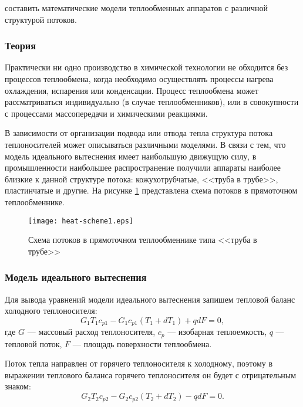 
\goal составить математические модели теплообменных аппаратов с различной структурой потоков.

\subsubsection{Теория}
Практически ни одно производство в химической технологии не обходится без процессов теплообмена, когда необходимо осуществлять процессы нагрева охлаждения, испарения или конденсации.
 Процесс теплообмена может рассматриваться индивидуально (в случае теплообменников), или в совокупности с процессами массопередачи и химическими реакциями.

В зависимости от организации подвода или отвода тепла структура потока теплоносителей может описываться различными моделями. В связи с тем, что модель идеального вытеснения имеет наибольшую движущую силу, в промышленности наибольшее распространение получили аппараты наиболее близкие к данной структуре потока: кожухотрубчатые, <<труба в трубе>>, пластинчатые и другие. На рисунке  \ref{fig:heat.scheme1} представлена схема потоков в прямоточном теплообменнике.

\begin{figure}[h]
	\begin{center}
		\texttt{[image: heat-scheme1.eps]}
	\end{center}
	\caption{Схема потоков в прямоточном теплообменнике типа <<труба в трубе>>} \label{fig:heat.scheme1}
\end{figure}

\subsubsection*{Модель идеального вытеснения}
Для вывода уравнений модели идеального вытеснения запишем тепловой баланс холодного теплоносителя:
\begin{equation}\label{eq:tbal-cold}
	G_1 T_1 c_{p1}-G_1 c_{p1} (T_1+ d T_1) + q d F=0,
\end{equation}
где $G$ --- массовый расход теплоносителя, $c_p$ --- изобарная теплоемкость, $q$ --- тепловой поток, $F$ --- площадь поверхности теплообмена.

Поток тепла направлен от горячего теплоносителя к холодному, поэтому в выражении  теплового баланса горячего теплоносителя он будет с отрицательным знаком:
\begin{equation}\label{eq:tbal-hot}
	G_2 T_2 c_{p2} -G_2 c_{p2} (T_2 + d T_2) - q d F =0.
\end{equation}

